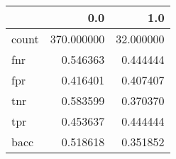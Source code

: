 \begin{tabular}{lrr}
\toprule
{} &         0.0 &        1.0 \\
\midrule
count &  370.000000 &  32.000000 \\
fnr   &    0.546363 &   0.444444 \\
fpr   &    0.416401 &   0.407407 \\
tnr   &    0.583599 &   0.370370 \\
tpr   &    0.453637 &   0.444444 \\
bacc  &    0.518618 &   0.351852 \\
\bottomrule
\end{tabular}

